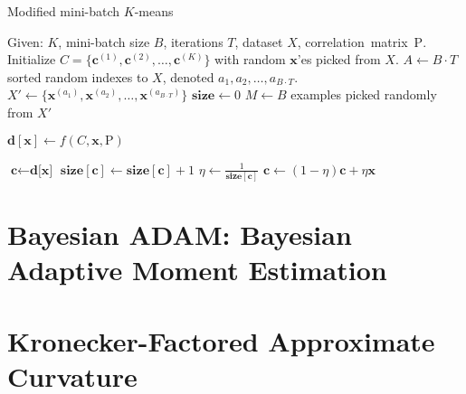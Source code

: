 
\begin{algorithm}
    \caption{Modified mini-batch $K$-means} \label{modifiedminibatch}
    \begin{algorithmic}[1]
        \State Given: $K$, mini-batch size $B$, iterations $T$, dataset $X$, correlation~matrix~$\mathrm{P}$.
        \State Initialize $C = \{\mathbf{c}^{(1)}, \mathbf{c}^{(2)}, \ldots, \mathbf{c}^{(K)}\}$ with random $\mathbf{x}$'es picked from $X$.
        \State $A \gets B \cdot T$ sorted random indexes to $X$, denoted $a_1, a_2, \ldots, a_{B\cdot T}$.
        \State $X' \gets \{\mathbf{x}^{(a_1)}, \mathbf{x}^{(a_2)}, \ldots, \mathbf{x}^{(a_{B\cdot T})}\}$ 
        \State $\textbf{size} \gets 0$
        \State $M \gets B$ examples picked randomly from $X'$

         
        \State $\textbf{d}[\textbf{x}] \gets f(C,\mathbf{x}, \mathrm{P})$ 
        \EndFor

         
        \State $\textbf{c} \gets \textbf{d[x]}$ 
        \State $\textbf{size}[\textbf{c}] \gets \textbf{size}[\textbf{c}] + 1$ 
        \State $\eta \gets \frac{1}{\textbf{size}[\textbf{c}]}$       
        \State $\textbf{c} \gets (1 - \eta)\textbf{c}+\eta\textbf{x}$ 
        \EndFor
        \EndFor
        \State {}
    \end{algorithmic}
\end{algorithm}

\section{Bayesian ADAM: Bayesian Adaptive Moment Estimation}

\cite{khan2017variational, zhang2018noisy, miani2022laplacian}

\section{Kronecker-Factored Approximate Curvature}

\cite{martens2015optimizing}

